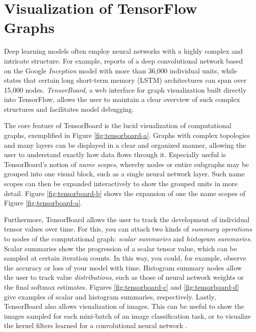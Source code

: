 \section{Visualization of TensorFlow Graphs}\label{sec:visual}

Deep learning models often employ neural networks with a highly complex and
intricate structure. For example, \cite{inception} reports of a deep
convolutional network based on the Google \emph{Inception} model with more than
36,000 individual units, while \cite{tensorflow} states that certain long
short-term memory (LSTM) architectures can span over 15,000
nodes. \emph{TensorBoard}, a web interface for graph visualization built
directly into TensorFlow, allows the user to maintain a clear overview of such
complex structures and facilitates model debugging.

The core feature of TensorBoard is the lucid visualization of computational
graphs, exemplified in Figure \ref{fig:tensorboard-a}. Graphs with complex
topologies and many layers can be displayed in a clear and organized manner,
allowing the user to understand exactly how data flows through it. Especially
useful is TensorBoard's notion of \emph{name scopes}, whereby nodes or entire
subgraphs may be grouped into one visual block, such as a single neural network
layer. Such name scopes can then be expanded interactively to show the grouped
units in more detail. Figure \ref{fig:tensorboard-b} shows the expansion of one
the name scopes of Figure \ref{fig:tensorboard-a}.

Furthermore, TensorBoard allows the user to track the development of individual
tensor values over time. For this, you can attach two kinds of \emph{summary
  operations} to nodes of the computational graph: \emph{scalar summaries} and
\emph{histogram summaries}. Scalar summaries show the progression of a scalar
tensor value, which can be sampled at certain iteration counts. In this way, you
could, for example, observe the accuracy or loss of your model with
time. Histogram summary nodes allow the user to track value
\emph{distributions}, such as those of neural network weights or the final
softmax estimates. Figures \ref{fig:tensorboard-c} and \ref{fig:tensorboard-d}
give examples of scalar and histogram summaries, respectively. Lastly,
TensorBoard also allows visualization of images. This can be useful to show the
images sampled for each mini-batch of an image classification task, or to
visualize the kernel filters learned for a convolutional neural network
\cite{tensorflow}.

